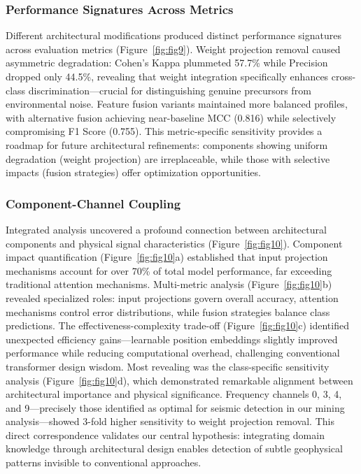 \documentclass[preprint,review,12pt,authoryear]{elsarticle}
\begin{document}
\subsubsection{Performance Signatures Across Metrics}
Different architectural modifications produced distinct performance signatures across evaluation metrics (Figure~\ref{fig:fig9}). Weight projection removal caused asymmetric degradation: Cohen's Kappa plummeted 57.7\% while Precision dropped only 44.5\%, revealing that weight integration specifically enhances cross-class discrimination---crucial for distinguishing genuine precursors from environmental noise. Feature fusion variants maintained more balanced profiles, with alternative fusion achieving near-baseline MCC (0.816) while selectively compromising F1 Score (0.755). This metric-specific sensitivity provides a roadmap for future architectural refinements: components showing uniform degradation (weight projection) are irreplaceable, while those with selective impacts (fusion strategies) offer optimization opportunities.

\subsubsection{Component-Channel Coupling}
Integrated analysis uncovered a profound connection between architectural components and physical signal characteristics (Figure~\ref{fig:fig10}). Component impact quantification (Figure~\ref{fig:fig10}a) established that input projection mechanisms account for over 70\% of total model performance, far exceeding traditional attention mechanisms. Multi-metric analysis (Figure~\ref{fig:fig10}b) revealed specialized roles: input projections govern overall accuracy, attention mechanisms control error distributions, while fusion strategies balance class predictions. The effectiveness-complexity trade-off (Figure~\ref{fig:fig10}c) identified unexpected efficiency gains---learnable position embeddings slightly improved performance while reducing computational overhead, challenging conventional transformer design wisdom.
Most revealing was the class-specific sensitivity analysis (Figure~\ref{fig:fig10}d), which demonstrated remarkable alignment between architectural importance and physical significance. Frequency channels 0, 3, 4, and 9---precisely those identified as optimal for seismic detection in our mining analysis---showed 3-fold higher sensitivity to weight projection removal. This direct correspondence validates our central hypothesis: integrating domain knowledge through architectural design enables detection of subtle geophysical patterns invisible to conventional approaches.
\end{document}
